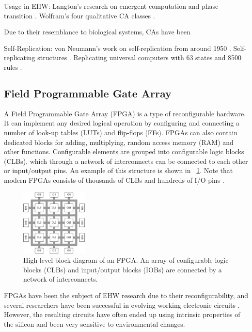 Usage in EHW:
Langton's research on emergent computation and phase transition \cite{langton1990edgeofchaos}.
Wolfram's four qualitative CA classes \cite{wolfram1984complexity}.

Due to their resemblance to biological systems, CAs have been 

Self-Replication:
von Neumann's work on self-replication from around 1950 \cite{neumann1966selfreplication}.
Self-replicating structures \cite{reggia1998neumann}.
Replicating universal computers with 63 states and 8500 rules \cite{perrier1996toward}.

\subsection{Field Programmable Gate Array}

A Field Programmable Gate Array (FPGA) is a type of reconfigurable hardware.
It can implement any desired logical operation by configuring and connecting a number of look-up tables (LUTs) and flip-flops (FFs).
FPGAs can also contain dedicated blocks for adding, multiplying, random access memory (RAM) and other functions.
Configurable elements are grouped into configurable logic blocks (CLBs), which through a network of interconnects can be connected to each other or input/output pins.
An example of this structure is shown in \figurename~\ref{fig:fpga}.
Note that modern FPGAs consists of thousands of CLBs and hundreds of I/O pins \cite{ds160}.

\begin{figure}[!ht]
    \centering
    \includegraphics[width=0.30\textwidth]{figures/fpga}
    \caption{High-level block diagram of an FPGA. An array of configurable logic blocks (CLBs) and input/output blocks (IOBs) are connected by a network of interconnects.}
    \label{fig:fpga}
\end{figure}

FPGAs have been the subject of EHW research due to their reconfigurability, and several researchers have been successful in evolving working electronic circuits \cite{huelsbergen1998evolution} \cite{thompson1997evolved}.
However, the resulting circuits have often ended up using intrinsic properties of the silicon and been very sensitive to environmental changes.

